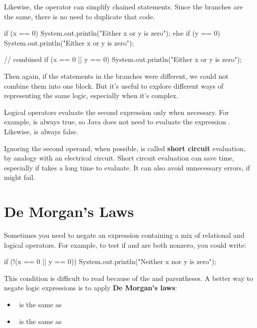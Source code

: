 Likewise, the \java{||} operator can simplify chained  statements.
Since the branches are the same, there is no need to duplicate that code.

\begin{code}
if (x == 0) {
    System.out.println("Either x or y is zero");
} else if (y == 0) {
    System.out.println("Either x or y is zero");
}
\end{code}

\begin{code}
// combined
if (x == 0 || y == 0) {
    System.out.println("Either x or y is zero");
}
\end{code}

Then again, if the statements in the branches were different, we could not combine them into one block.
But it's useful to explore different ways of representing the same logic, especially when it's complex.


Logical operators evaluate the second expression only when necessary.
For example,  is always true, so Java does not need to evaluate the expression .
Likewise,  is always false.

Ignoring the second operand, when possible, is called {\bf short circuit} evaluation, by analogy with an electrical circuit.
Short circuit evaluation can save time, especially if  takes a long time to evaluate.
It can also avoid unnecessary errors, if  might fail.


\section{De Morgan's Laws}

Sometimes you need to negate an expression containing a mix of relational and logical operators.
For example, to test if  and  are both nonzero, you could write:

\begin{code}
if (!(x == 0 || y == 0)) {
    System.out.println("Neither x nor y is zero");
}
\end{code}


This condition is difficult to read because of the \java{!} and parentheses.
A better way to negate logic expressions is to apply {\bf De Morgan's laws}:

\begin{itemize}
\item {} ~is the same as~ 
\item {} ~is the same as~ 
\end{itemize}

